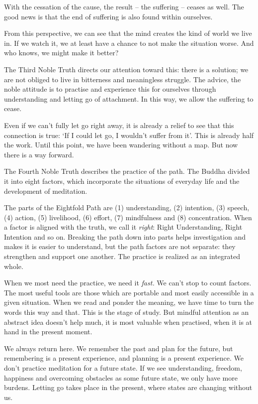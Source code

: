 
With the cessation of the cause, the result -- the suffering -- ceases
as well. The good news is that the end of suffering is also found within
ourselves.

From this perspective, we can see that the mind creates the kind of
world we live in. If we watch it, we at least have a chance to not make
the situation worse. And who knows, we might make it better?

The Third Noble Truth directs our attention toward this: there is a
solution; we are not obliged to live in bitterness and meaningless
struggle. The advice, the noble attitude is to practise and experience
this for ourselves through understanding and letting go of attachment.
In this way, we allow the suffering to cease.

Even if we can't fully let go right away, it is already a relief to see
that this connection is true: `If I could let go, I wouldn't suffer from
it'. This is already half the work. Until this point, we have been
wandering without a map. But now there is a way forward.


\enlargethispage*{\baselineskip}

The Fourth Noble Truth describes the practice of the path. The Buddha
divided it into eight factors, which incorporate the situations of
everyday life and the development of meditation.

\clearpage

The parts of the Eightfold Path are (1) understanding, (2) intention,
(3) speech, (4) action, (5) livelihood, (6) effort, (7) mindfulness and
(8) concentration. When a factor is aligned with the truth, we call it
\emph{right}: Right Understanding, Right Intention and so on. Breaking
the path down into parts helps investigation and makes it is easier to
understand, but the path factors are not separate: they strengthen and
support one another. The practice is realized as an integrated whole.

When we most need the practice, we need it \emph{fast.} We can't stop to
count factors. The most useful tools are those which are portable and
most easily accessible in a given situation. When we read and ponder the
meaning, we have time to turn the words this way and that. This is the
stage of study. But mindful attention as an abstract idea doesn't help
much, it is most valuable when practised, when it is at hand in the
present moment.

We always return here. We remember the past and plan for the future, but
remembering is a present experience, and planning is a present
experience. We don't practice meditation for a future state. If we see
understanding, freedom, happiness and overcoming obstacles as some
future state, we only have more burdens. Letting go takes place in the
present, where states are changing without us.
